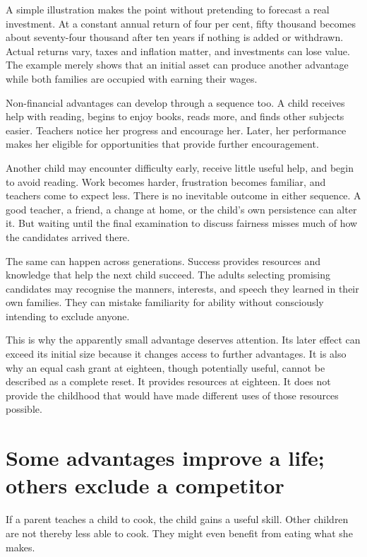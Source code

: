 \documentclass[12pt,a4paper]{book}
\begin{document}
A simple illustration makes the point without pretending to forecast a real investment. At a constant annual return of four per cent, fifty thousand becomes about seventy-four thousand after ten years if nothing is added or withdrawn. Actual returns vary, taxes and inflation matter, and investments can lose value. The example merely shows that an initial asset can produce another advantage while both families are occupied with earning their wages.

Non-financial advantages can develop through a sequence too. A child receives help with reading, begins to enjoy books, reads more, and finds other subjects easier. Teachers notice her progress and encourage her. Later, her performance makes her eligible for opportunities that provide further encouragement.

Another child may encounter difficulty early, receive little useful help, and begin to avoid reading. Work becomes harder, frustration becomes familiar, and teachers come to expect less. There is no inevitable outcome in either sequence. A good teacher, a friend, a change at home, or the child's own persistence can alter it. But waiting until the final examination to discuss fairness misses much of how the candidates arrived there.

The same can happen across generations. Success provides resources and knowledge that help the next child succeed. The adults selecting promising candidates may recognise the manners, interests, and speech they learned in their own families. They can mistake familiarity for ability without consciously intending to exclude anyone.

This is why the apparently small advantage deserves attention. Its later effect can exceed its initial size because it changes access to further advantages. It is also why an equal cash grant at eighteen, though potentially useful, cannot be described as a complete reset. It provides resources at eighteen. It does not provide the childhood that would have made different uses of those resources possible.

\section*{Some advantages improve a life; others exclude a competitor}

If a parent teaches a child to cook, the child gains a useful skill. Other children are not thereby less able to cook. They might even benefit from eating what she makes.
\end{document}
